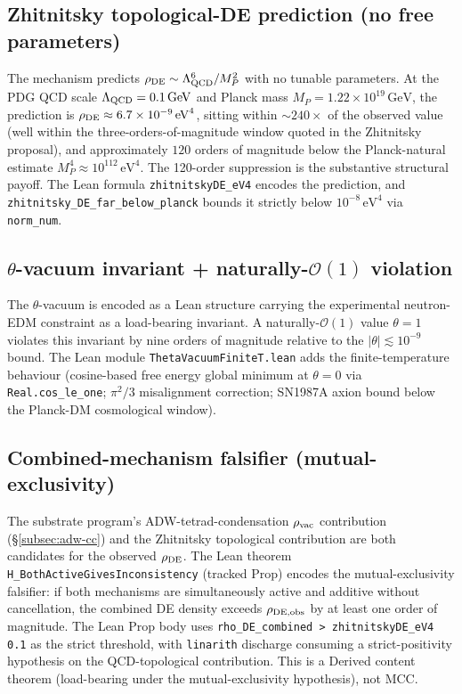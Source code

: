 \documentclass[aps,prd,reprint,nofootinbib,superscriptaddress]{revtex4-2}
\begin{document}
\subsection{Zhitnitsky topological-DE prediction (no free parameters)}
\label{subsec:zhitnitsky}

The mechanism predicts $\rho_{\rm DE} \sim \Lambda_{\rm QCD}^6 / M_P^2$
with no tunable parameters. At the PDG QCD scale
$\Lambda_{\rm QCD} = \SI{0.1}{\giga\electronvolt}$ and Planck mass
$M_P = 1.22 \times 10^{19}\,\text{GeV}$, the prediction is
$\rho_{\rm DE} \approx 6.7 \times 10^{-9}\,\text{eV}^4$, sitting within
${\sim}240\times$ of the observed value (well within the
three-orders-of-magnitude window quoted in the Zhitnitsky proposal),
and approximately $120$ orders of magnitude below the Planck-natural
estimate $M_P^4 \approx 10^{112}\,\text{eV}^4$. The 120-order
suppression is the substantive structural payoff. The Lean formula
\texttt{zhitnitskyDE\_eV4} encodes the prediction, and
\texttt{zhitnitsky\_DE\_far\_below\_planck} bounds it strictly below
$10^{-8}\,\text{eV}^4$ via \texttt{norm\_num}.

\subsection{$\theta$-vacuum invariant + naturally-$\mathcal{O}(1)$ violation}
\label{subsec:theta-vacuum-load-bearing-invariant}

The $\theta$-vacuum is encoded as a Lean structure carrying the
experimental neutron-EDM constraint as a load-bearing invariant. A
naturally-$\mathcal{O}(1)$ value $\theta = 1$ violates this invariant
by nine orders of magnitude relative to the
$|\theta| \lesssim 10^{-9}$ bound. The Lean module
\texttt{ThetaVacuumFiniteT.lean} adds the finite-temperature behaviour
(cosine-based free energy global minimum at $\theta = 0$ via
\texttt{Real.cos\_le\_one}; $\pi^2 / 3$ misalignment correction;
SN1987A axion bound below the Planck-DM cosmological window).

\subsection{Combined-mechanism falsifier (mutual-exclusivity)}
\label{subsec:combined-mechanism-falsifier}

The substrate program's ADW-tetrad-condensation $\rho_{\rm vac}$
contribution (§\ref{subsec:adw-cc}) and the Zhitnitsky topological
contribution are both candidates for the observed $\rho_{\rm DE}$. The
Lean theorem \texttt{H\_BothActiveGivesInconsistency} (tracked Prop)
encodes the mutual-exclusivity falsifier: if both mechanisms are
simultaneously active and additive without cancellation, the combined
DE density exceeds $\rho_{\rm DE,obs}$ by at least one order of
magnitude. The Lean Prop body uses
\texttt{rho\_DE\_combined > zhitnitskyDE\_eV4 0.1} as the strict
threshold, with \texttt{linarith} discharge consuming a strict-positivity
hypothesis on the QCD-topological contribution. This is a Derived
content theorem (load-bearing under the mutual-exclusivity hypothesis),
not MCC.
\end{document}

